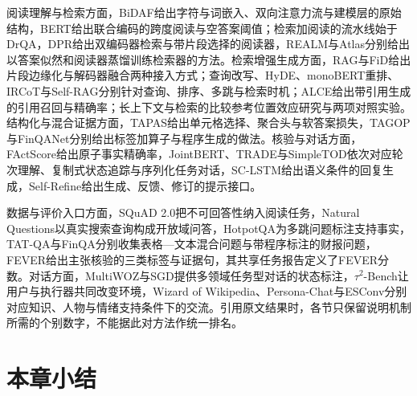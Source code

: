 阅读理解与检索方面，BiDAF给出字符与词嵌入、双向注意力流与建模层的原始结构\cite{nlp-dialogue-seo2017}，BERT给出联合编码的跨度阅读与空答案阈值\cite{devlin2019}；检索加阅读的流水线始于DrQA\cite{nlp-qa-chen2017drqa}，DPR给出双编码器检索与带片段选择的阅读器\cite{nlp-karpukhin2020dpr}，REALM与Atlas分别给出以答案似然和阅读器蒸馏训练检索器的方法\cite{nlp-qa-guu2020realm,nlp-qa-izacard2023atlas,nlp-qa-izacard2021distilling}。检索增强生成方面，RAG与FiD给出片段边缘化与解码器融合两种接入方式\cite{lewis2020rag,nlp-dialogue-izacard2021}；查询改写、HyDE、monoBERT重排、IRCoT与Self-RAG分别针对查询、排序、多跳与检索时机\cite{nlp-qa-ma2023rewrite,rs-s30,rs-s20,rs-s40,nlp-qa-asai2024selfrag}；ALCE给出带引用生成的引用召回与精确率\cite{nlp-qa-gao2023alce}；长上下文与检索的比较参考位置效应研究与两项对照实验\cite{liu2024middle,nlp-qa-xu2024retrieval-long,nlp-qa-li2024selfroute}。结构化与混合证据方面，TAPAS给出单元格选择、聚合头与软答案损失\cite{nlp-dialogue-herzig2020}，TAGOP与FinQANet分别给出标签加算子与程序生成的做法\cite{nlp-dialogue-zhu2021,nlp-dialogue-chen2021}。核验与对话方面，FActScore给出原子事实精确率\cite{min-etal-2023-factscore}，JointBERT、TRADE与SimpleTOD依次对应轮次理解、复制式状态追踪与序列化任务对话\cite{nlp-dialogue-chen2019,nlp-dialogue-wu2019,nlp-dialogue-hosseini2020}，SC-LSTM给出语义条件的回复生成\cite{nlp-dialogue-wen2015}，Self-Refine给出生成、反馈、修订的提示接口\cite{nlp-dialogue-madaan2023}。

数据与评价入口方面，SQuAD 2.0把不可回答性纳入阅读任务\cite{rajpurkar2018squad2}，Natural Questions以真实搜索查询构成开放域问答\cite{nlp-qa-kwiatkowski2019nq}，HotpotQA为多跳问题标注支持事实\cite{yang2018hotpotqa}，TAT-QA与FinQA分别收集表格—文本混合问题与带程序标注的财报问题\cite{nlp-dialogue-zhu2021,nlp-dialogue-chen2021}，FEVER给出主张核验的三类标签与证据句\cite{nlp-intro-thorne2018}，其共享任务报告定义了FEVER分数\cite{nlp-dialogue-thorne2018shared}。对话方面，MultiWOZ与SGD提供多领域任务型对话的状态标注\cite{budzianowski2018multiwoz,rastogi2020sgd}，$\tau^2$-Bench让用户与执行器共同改变环境\cite{nlp-intro-barres2025}，Wizard of Wikipedia、Persona-Chat与ESConv分别对应知识、人物与情绪支持条件下的交流\cite{nlp-intro-dinan2019,nlp-intro-zhang2018persona,nlp-dialogue-liu2021}。引用原文结果时，各节只保留说明机制所需的个别数字，不能据此对方法作统一排名。

\section{本章小结}
\label{sec:nlp-dialogue-summary}


